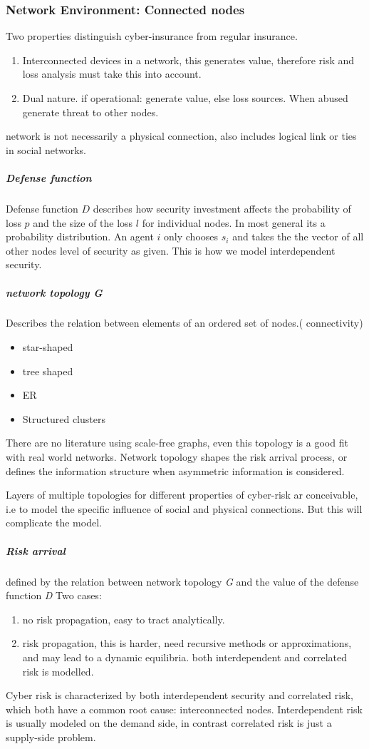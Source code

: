 \subsubsection{Network Environment: Connected nodes}
Two properties distinguish cyber-insurance from regular insurance.
\begin{enumerate}
\item Interconnected devices in a network, this generates value, therefore risk and loss analysis must take this into account. 
\item Dual nature. if operational: generate value, else loss sources. When abused generate threat to other nodes.
\end{enumerate}
network is not necessarily  a physical connection, also includes logical link or ties in social networks.
\subparagraph{Defense function}
Defense function $D$ describes how security investment affects the probability of loss $p $ and the size of the loss  $l $ for individual nodes.  In most general its a probability distribution.
An agent $i$ only chooses $s_{i}$ 
and takes the the vector of all other nodes level of security as given. 
This is how we model interdependent security. 

\subparagraph{network topology G}
Describes the relation between elements of an ordered set of nodes.( connectivity)
\begin{itemize}[topsep=-1em,parsep=0em,itemsep=0em] 
\item star-shaped \item tree shaped \item ER \item Structured clusters
\end{itemize}
There are no literature using scale-free graphs, even this topology is a good fit with real world networks.
Network topology shapes the risk arrival process, or defines the information structure when asymmetric
 information is considered.

Layers of multiple topologies for different properties of cyber-risk ar conceivable, 
i.e to model the specific influence of social and physical connections. But this will complicate the model.

\subparagraph{Risk arrival}
defined by the relation between network topology \textit{G} and the value of the defense
 function \textit{D}
 Two cases:
 \begin{enumerate}
 \item no risk propagation, easy to tract analytically.
 \item risk propagation, this is harder, need recursive methods or approximations, 
 and may lead to a dynamic equilibria. both interdependent and correlated risk is modelled. 
 \end{enumerate} 
Cyber risk is characterized by both interdependent security and correlated risk, 
which both have a common root cause: interconnected nodes. 
Interdependent risk is usually modeled on the demand side,
 in contrast correlated risk is just a supply-side problem.

